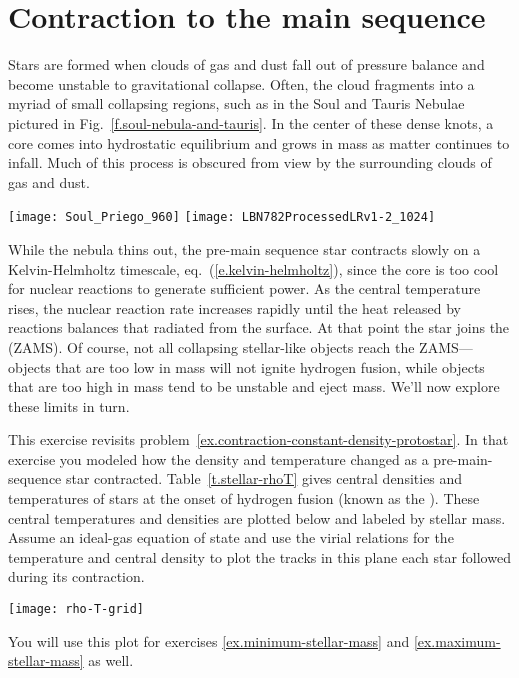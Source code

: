 \section{Contraction to the main sequence}
\label{s.contraction-to-main-sequence}

Stars are formed when clouds of gas and dust fall out of pressure balance and become unstable to gravitational collapse. Often, the cloud fragments into a myriad of small collapsing regions, such as in the Soul and Tauris Nebulae pictured in Fig.~\ref{f.soul-nebula-and-tauris}. In the center of these dense knots, a core comes into hydrostatic equilibrium and grows in mass as matter continues to infall. Much of this process is obscured from view by the surrounding clouds of gas and dust.
\begin{marginfigure}
\texttt{[image: Soul\_Priego\_960]}
\texttt{[image: LBN782ProcessedLRv1-2\_1024]}
\caption[Pre-main sequence stars]{\label{f.soul-nebula-and-tauris} (Top) Image of the Soul Nebula (IC 1848) in the constellation Cassiopeia. \imgcred\ Jos\'e Jim\'enez Priego (Astromet). (Bottom) The Taurus molecular cloud. At right are million-year old pre-main sequence stars still embedded in dust clouds. \imgcredcopy\ Lloyd L. Smith, Deep Sky West.}
\end{marginfigure}

While the nebula thins out, the pre-main sequence star contracts slowly on a Kelvin-Helmholtz timescale, eq.~(\ref{e.kelvin-helmholtz}), since the core is too cool for nuclear reactions to generate sufficient power. As the central temperature rises, the nuclear reaction rate increases rapidly until the heat released by reactions balances that radiated from the surface. At that point the star joins the  (ZAMS). Of course, not all collapsing stellar-like objects reach the ZAMS---objects that are too low in mass will not ignite hydrogen fusion, while objects that are too high in mass tend to be unstable and eject mass. We'll now explore these limits in turn.

\begin{exercisebox}
\label{ex.contraction-to-main-sequence}
This exercise revisits problem~\ref{ex.contraction-constant-density-protostar}. In that exercise you modeled how the density and temperature changed as a pre-main-sequence star contracted. Table~\ref{t.stellar-rhoT} gives central densities and temperatures of stars at the onset of hydrogen fusion (known as the ). These central temperatures and densities are plotted below and labeled by stellar mass. Assume an ideal-gas equation of state and use the virial relations for the temperature and central density to plot the tracks in this plane each star followed during its contraction.
\begin{center}
\texttt{[image: rho-T-grid]}
\end{center}
You will use this plot for exercises \ref{ex.minimum-stellar-mass} and \ref{ex.maximum-stellar-mass} as well.
\end{exercisebox}

